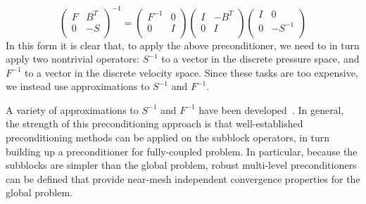 \documentclass[12pt,relax]{TPA}
\begin{document}
\begin{equation}
\label{eq:blockfactor2}
\left(\begin{array}{cc}
	F & B^T \\
	0  &-S \\
\end{array}\right)^{-1}
=
\left(\begin{array}{cc}
F^{-1} & 0 \\
0      & I \\
\end{array}\right)
\left(\begin{array}{cc}
I & -B^T \\
0  & I \\
\end{array}\right)
\left(\begin{array}{cc}
I & 0 \\
0  & -S^{-1} \\
\end{array}\right)
\end{equation}
In this form it is clear that, to apply the above
preconditioner, we need to in turn apply two nontrivial operators:
$S^{-1}$ to a vector in the discrete pressure space, and $F^{-1}$ to a
vector in the discrete velocity space.  Since these tasks are too
expensive, we instead use approximations to $S^{-1}$ and
$F^{-1}$.

A variety of approximations to $S^{-1}$ and $F^{-1}$ have been
developed~\cite{ElmaHowlShadTumi2003}.  In general,
the strength of this preconditioning approach is that
well-established preconditioning methods can be applied on the
subblock operators, in turn building up a preconditioner for
fully-coupled problem.  In particular, because the subblocks are
simpler than the global problem, robust multi-level preconditioners
can be defined that provide near-mesh independent convergence
properties for the global problem.
\end{document}
